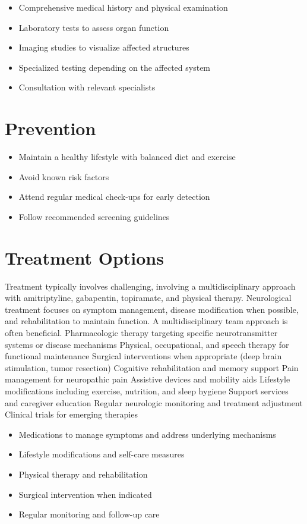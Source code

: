 \begin{itemize}[noitemsep]
  \item Comprehensive medical history and physical examination
  \item Laboratory tests to assess organ function
  \item Imaging studies to visualize affected structures
  \item Specialized testing depending on the affected system
  \item Consultation with relevant specialists
\end{itemize}
\section{Prevention}
\begin{itemize}[noitemsep]
  \item Maintain a healthy lifestyle with balanced diet and exercise
  \item Avoid known risk factors
  \item Attend regular medical check-ups for early detection
  \item Follow recommended screening guidelines
\end{itemize}
\section{Treatment Options}
Treatment typically involves challenging, involving a multidisciplinary approach with amitriptyline, gabapentin, topiramate, and physical therapy. Neurological treatment focuses on symptom management, disease modification when possible, and rehabilitation to maintain function. A multidisciplinary team approach is often beneficial. Pharmacologic therapy targeting specific neurotransmitter systems or disease mechanisms Physical, occupational, and speech therapy for functional maintenance Surgical interventions when appropriate (deep brain stimulation, tumor resection) Cognitive rehabilitation and memory support Pain management for neuropathic pain Assistive devices and mobility aids Lifestyle modifications including exercise, nutrition, and sleep hygiene Support services and caregiver education Regular neurologic monitoring and treatment adjustment Clinical trials for emerging therapies

\begin{itemize}[noitemsep]
  \item Medications to manage symptoms and address underlying mechanisms
  \item Lifestyle modifications and self-care measures
  \item Physical therapy and rehabilitation
  \item Surgical intervention when indicated
  \item Regular monitoring and follow-up care
\end{itemize}
